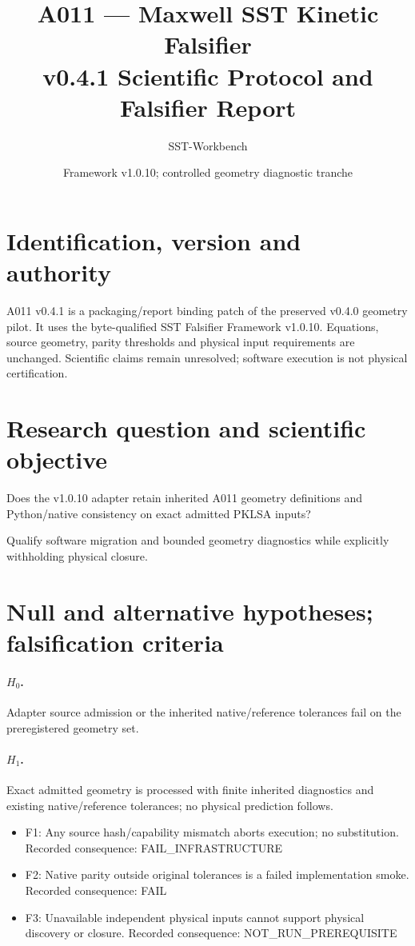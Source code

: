 \documentclass[10pt,a4paper]{article}
\title{A011 --- Maxwell SST Kinetic Falsifier\\v0.4.1 Scientific Protocol and Falsifier Report}
\author{SST-Workbench}
\date{Framework v1.0.10; controlled geometry diagnostic tranche}
\begin{document}
\maketitle
\section{Identification, version and authority}
A011 v0.4.1 is a packaging/report binding patch of the preserved v0.4.0 geometry pilot. It uses the byte-qualified SST Falsifier Framework v1.0.10. Equations, source geometry, parity thresholds and physical input requirements are unchanged. Scientific claims remain unresolved; software execution is not physical certification.
\section{Research question and scientific objective}
Does the v1.0.10 adapter retain inherited A011 geometry definitions and Python/native consistency on exact admitted PKLSA inputs?

Qualify software migration and bounded geometry diagnostics while explicitly withholding physical closure.
\section{Null and alternative hypotheses; falsification criteria}
\paragraph{$H_0$.} Adapter source admission or the inherited native/reference tolerances fail on the preregistered geometry set.\paragraph{$H_1$.} Exact admitted geometry is processed with finite inherited diagnostics and existing native/reference tolerances; no physical prediction follows.
\begin{itemize}
\item F1: Any source hash/capability mismatch aborts execution; no substitution. Recorded consequence: FAIL\_INFRASTRUCTURE
\item F2: Native parity outside original tolerances is a failed implementation smoke. Recorded consequence: FAIL
\item F3: Unavailable independent physical inputs cannot support physical discovery or closure. Recorded consequence: NOT\_RUN\_PREREQUISITE
\end{itemize}
\end{document}

